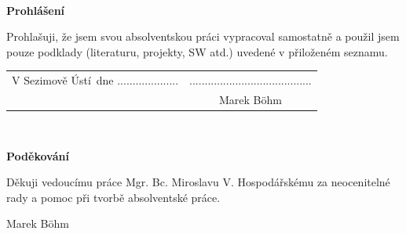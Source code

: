 \documentclass[a4paper,twoside,12pt]{book}
\newcommand{\tb}{\textbf} %
\newcommand{\woman}{} %
\newcommand{\autor}{Marek Böhm}   %
\newcommand{\kde}{Sezimově Ústí} %
\newcommand{\prohlaseni}{Prohlašuji, že jsem svou absolventskou práci vypracoval\woman{} samostatně a použil\woman{} jsem pouze podklady (literaturu, projekty, SW atd.) uvedené v přiloženém seznamu.} %
\newcommand{\podekovani}{Děkuji vedoucímu práce Mgr. Bc. Miroslavu V. Hospodářskému za neocenitelné rady a pomoc při tvorbě absolventské práce.} %
\begin{document}
\newpage %
\thispagestyle{empty}  %

~ %
\vfill %

\tb{Prohlášení} %

\vspace{1em} %
\prohlaseni

\vspace{2em}  %
\hspace{-0.5em}\begin{tabularx}{\textwidth}{X c}  %
V \kde\ dne .................... &........................................ \\	%
	& \autor
\end{tabularx}	%


\newpage
\thispagestyle{empty}

~
\vfill %


\tb{Poděkování}

\vspace{1em} %
\podekovani
\begin{flushright}
\autor
\end{flushright}  %


\newpage   %
\thispagestyle{empty}   %

\newbox\odstavecbox
\newlength\vyskaodstavce
\newcommand\odstavec[2]{%
    \setbox\odstavecbox=\hbox{%
         \parbox[t]{#1}{#2\vrule width 0pt depth 4pt}}%
    \global\vyskaodstavce=\dp\odstavecbox
    \box\odstavecbox}
\newcommand{\delka}{120mm} %
\end{document}
